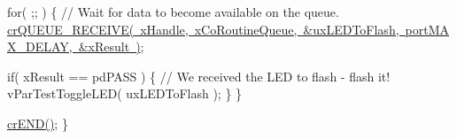 \begin{DoxyPre}   for( ;; )
   \{
       // Wait for data to become available on the queue.
       \mbox{\hyperlink{croutine_8h_a586d57fd9a3e2aa5ae66484ed3be36c9}{crQUEUE\_RECEIVE( xHandle, xCoRoutineQueue, \&uxLEDToFlash, portMAX\_DELAY, \&xResult )}};\end{DoxyPre}



\begin{DoxyPre}       if( xResult == pdPASS )
       \{
           // We received the LED to flash - flash it!
           vParTestToggleLED( uxLEDToFlash );
       \}
   \}\end{DoxyPre}



\begin{DoxyPre}   \mbox{\hyperlink{croutine_8h_ae6038cc976689b50000475ebfc4e2f23}{crEND()}};
\}\end{DoxyPre}
 
